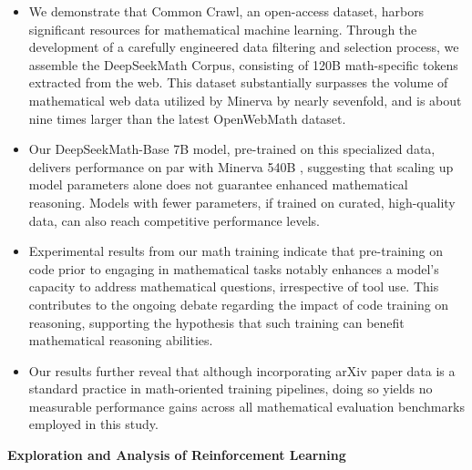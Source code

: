 \begin{itemize}[topsep=0pt]
    \item We demonstrate that Common Crawl, an open-access dataset, harbors significant resources for mathematical machine learning. Through the development of a carefully engineered data filtering and selection process, we assemble the DeepSeekMath Corpus, consisting of 120B math-specific tokens extracted from the web. This dataset substantially surpasses the volume of mathematical web data utilized by Minerva \citep{minerva} by nearly sevenfold, and is about nine times larger than the latest OpenWebMath \citep{openwebmath} dataset.

    \item Our DeepSeekMath-Base 7B model, pre-trained on this specialized data, delivers performance on par with Minerva 540B \citep{minerva}, suggesting that scaling up model parameters alone does not guarantee enhanced mathematical reasoning. Models with fewer parameters, if trained on curated, high-quality data, can also reach competitive performance levels.

    \item Experimental results from our math training indicate that pre-training on code prior to engaging in mathematical tasks notably enhances a model’s capacity to address mathematical questions, irrespective of tool use. This contributes to the ongoing debate regarding the impact of code training on reasoning, supporting the hypothesis that such training can benefit mathematical reasoning abilities.

    \item Our results further reveal that although incorporating arXiv paper data is a standard practice in math-oriented training pipelines, doing so yields no measurable performance gains across all mathematical evaluation benchmarks employed in this study.
\end{itemize}

\textbf{Exploration and Analysis of Reinforcement Learning}

